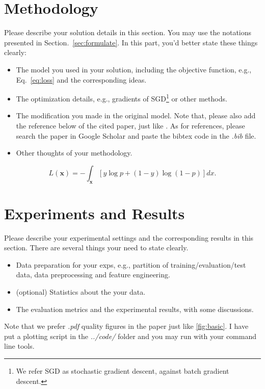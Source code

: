 \documentclass{article}
\newcommand{\bs}{\boldsymbol}
\begin{document}
\section{Methodology}\label{sec:method}
Please describe your solution details in this section.
You may use the notations presented in Section.~\ref{sec:formulate}.
In this part, you'd better state these things clearly:
\begin{itemize}
	\item The model you used in your solution, including the objective function, e.g., Eq.~\ref{eq:loss} and the corresponding ideas.
	\item The optimization details, e.g., gradients of SGD\footnote{We refer SGD as stochastic gradient descent, against batch gradient descent.} or other methods.
	\item The modification you made in the original model. Note that, please also add the reference below of the cited paper, just like \cite{zhang2014optimal}. As for references, please search the paper in Google Scholar and paste the bibtex code in the \textit{.bib} file.
	\item Other thoughts of your methodology.
\end{itemize}

\begin{equation}\label{eq:loss}
	L(\bs{x}) = - \int_{\bs{x}} [y \log{p} + (1-y) \log{(1-p)}] dx .
\end{equation}

\section{Experiments and Results}\label{sec:exps}
Please describe your experimental settings and the corresponding results in this section.
There are several things your need to state clearly.
\begin{itemize}
	\item Data preparation for your exps, e.g., partition of training/evaluation/test data, data preprocessing and feature engineering.
	\item (optional) Statistics about the your data.
	\item The evaluation metrics and the experimental results, with some discussions.
\end{itemize}
Note that we prefer \textit{.pdf} quality figures in the paper just like \ref{fig:basic}.
I have put a plotting script in the \textit{../code/} folder and you may run with your command line tools.
\end{document}
